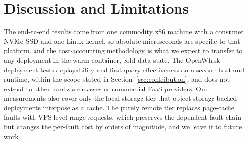 \documentclass[sigconf, nonacm]{acmart}
\begin{document}

\section{Discussion and Limitations}\label{sec:discussion}

The end-to-end results come from one commodity x86 machine with a consumer NVMe SSD and one Linux kernel, so absolute microseconds are specific to that platform, and the cost-accounting methodology is what we expect to transfer to any deployment in the warm-container, cold-data state. The OpenWhisk deployment tests deployability and first-query effectiveness on a second host and runtime, within the scope stated in Section~\ref{sec:contribution}, and does not extend to other hardware classes or commercial FaaS providers. Our measurements also cover only the local-storage tier that object-storage-backed deployments interpose as a cache. The purely remote tier replaces page-cache faults with VFS-level range requests, which preserves the dependent fault chain but changes the per-fault cost by orders of magnitude, and we leave it to future work.
\end{document}

